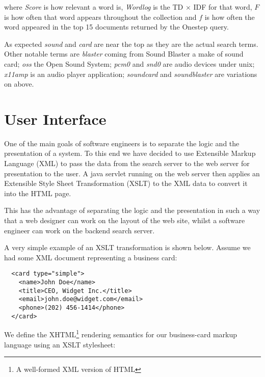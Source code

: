 where \emph{Score} is how relevant a word is, \emph{Wordlog} is the TD $\times$ IDF for that word, $F$ is how often that word appears throughout the collection and $f$ is how often the word appeared in the top 15 documents returned by the Onestep query.

As expected \emph{sound} and \emph{card} are near the top as they are the actual search terms.  Other notable terms are \emph{blaster} coming from Sound Blaster a make of sound card; \emph{oss} the Open Sound System; \emph{pcm0} and \emph{snd0} are audio devices under unix; \emph{x11amp} is an audio player application; \emph{soundcard} and \emph{soundblaster} are variations on above.

\section{User Interface}
\label{sec:ui}
One of the main goals of software engineers is to separate the logic and the presentation of a system.  To this end we have decided to use Extensible Markup Language (XML) \cite{www:xml} to pass the data from the search server to the web server for presentation to the user.  A java servlet running on the web server then applies an Extensible Style Sheet Transformation (XSLT) \cite{www:xslt} to the XML data to convert it into the HTML page.

This has the advantage of separating the logic and the presentation in such a way that a web designer can work on the layout of the web site, whilst a software engineer can work on the backend search server.

A very simple example of an XSLT transformation is shown below.  Assume we had some XML document representing a business card:

\begin{verbatim}
  <card type="simple">
    <name>John Doe</name>
    <title>CEO, Widget Inc.</title>
    <email>john.doe@widget.com</email>
    <phone>(202) 456-1414</phone>
  </card>
\end{verbatim}


We define the XHTML\footnote{A well-formed XML version of HTML} rendering semantics for our business-card markup language using an XSLT stylesheet: 

